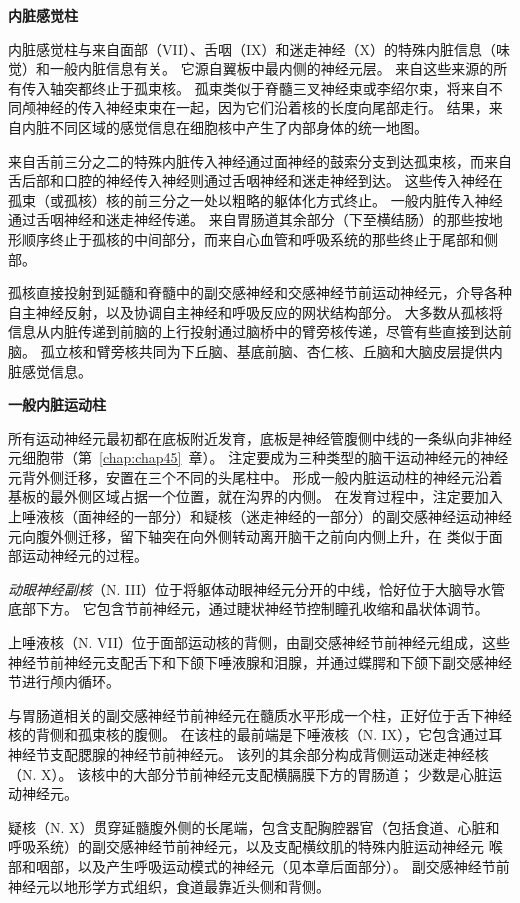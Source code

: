 \textbf{内脏感觉柱}

内脏感觉柱与来自面部（VII）、舌咽（IX）和迷走神经（X）的特殊内脏信息（味觉）和一般内脏信息有关。
它源自翼板中最内侧的神经元层。
来自这些来源的所有传入轴突都终止于孤束核。
孤束类似于脊髓三叉神经束或李绍尔束，将来自不同颅神经的传入神经束束在一起，因为它们沿着核的长度向尾部走行。
结果，来自内脏不同区域的感觉信息在细胞核中产生了内部身体的统一地图。


来自舌前三分之二的特殊内脏传入神经通过面神经的鼓索分支到达孤束核，而来自舌后部和口腔的神经传入神经则通过舌咽神经和迷走神经到达。
这些传入神经在孤束（或孤核）核的前三分之一处以粗略的躯体化方式终止。
一般内脏传入神经通过舌咽神经和迷走神经传递。
来自胃肠道其余部分（下至横结肠）的那些按地形顺序终止于孤核的中间部分，而来自心血管和呼吸系统的那些终止于尾部和侧部。


孤核直接投射到延髓和脊髓中的副交感神经和交感神经节前运动神经元，介导各种自主神经反射，以及协调自主神经和呼吸反应的网状结构部分。
大多数从孤核将信息从内脏传递到前脑的上行投射通过脑桥中的臂旁核传递，尽管有些直接到达前脑。
孤立核和臂旁核共同为下丘脑、基底前脑、杏仁核、丘脑和大脑皮层提供内脏感觉信息。


\textbf{一般内脏运动柱}

所有运动神经元最初都在底板附近发育，底板是神经管腹侧中线的一条纵向非神经元细胞带（第~\ref{chap:chap45}~章）。
注定要成为三种类型的脑干运动神经元的神经元背外侧迁移，安置在三个不同的头尾柱中。
形成一般内脏运动柱的神经元沿着基板的最外侧区域占据一个位置，就在沟界的内侧。
在发育过程中，注定要加入上唾液核（面神经的一部分）和疑核（迷走神经的一部分）的副交感神经运动神经元向腹外侧迁移，留下轴突在向外侧转动离开脑干之前向内侧上升，在 类似于面部运动神经元的过程。


\textit{动眼神经副核}（N. III）位于将躯体动眼神经元分开的中线，恰好位于大脑导水管底部下方。
它包含节前神经元，通过睫状神经节控制瞳孔收缩和晶状体调节。


上唾液核（N. VII）位于面部运动核的背侧，由副交感神经节前神经元组成，这些神经节前神经元支配舌下和下颌下唾液腺和泪腺，并通过蝶腭和下颌下副交感神经节进行颅内循环。


与胃肠道相关的副交感神经节前神经元在髓质水平形成一个柱，正好位于舌下神经核的背侧和孤束核的腹侧。
在该柱的最前端是下唾液核（N. IX），它包含通过耳神经节支配腮腺的神经节前神经元。
该列的其余部分构成背侧运动迷走神经核（N. X）。
该核中的大部分节前神经元支配横膈膜下方的胃肠道；
少数是心脏运动神经元。


疑核（N. X）贯穿延髓腹外侧的长尾端，包含支配胸腔器官（包括食道、心脏和呼吸系统）的副交感神经节前神经元，以及支配横纹肌的特殊内脏运动神经元 喉部和咽部，以及产生呼吸运动模式的神经元（见本章后面部分）。
副交感神经节前神经元以地形学方式组织，食道最靠近头侧和背侧。


